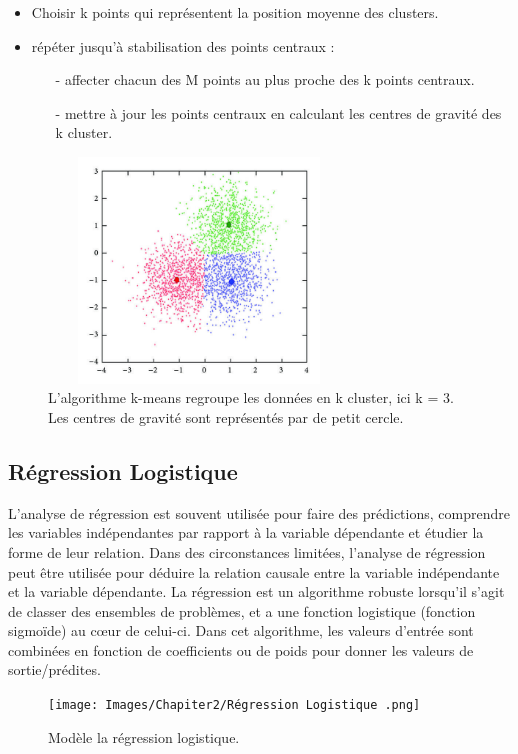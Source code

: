 \begin{itemize}
\item Choisir k points qui représentent la position moyenne des clusters.
\item répéter jusqu’à stabilisation des points centraux :
\begin{itemize}
\item[-] affecter chacun des M points au plus proche des k points centraux.
\item[-]mettre à jour les points centraux en calculant les centres de gravité des k cluster.
\end{itemize}
\end{itemize}

\begin{figure}[!h]
\centering
\includegraphics[width=8cm, height=6cm]{Images/Chapiter2/k-means.png}
\caption{L’algorithme k-means regroupe les données en k cluster, ici k = 3. Les centres de gravité sont représentés par de petit cercle.}
\label{fig:04}
\end{figure}

\subsection{Régression Logistique}
L'analyse de régression est souvent utilisée pour faire des prédictions, comprendre les variables indépendantes par rapport à la variable dépendante et étudier la forme de leur relation.
Dans des circonstances limitées, l'analyse de régression peut être utilisée pour déduire la relation causale entre la variable indépendante et la variable dépendante.
La régression est un algorithme robuste lorsqu'il s'agit de classer des ensembles de problèmes, et a une fonction logistique (fonction sigmoïde) au cœur de celui-ci. Dans cet algorithme, les valeurs d'entrée sont combinées en fonction de coefficients ou de poids pour donner les valeurs de sortie/prédites. 

\begin{figure}[!h]
\centering
\texttt{[image: Images/Chapiter2/Régression Logistique .png]}
\caption{Modèle la régression logistique.}
\label{fig:05}
\end{figure}
\newpage
